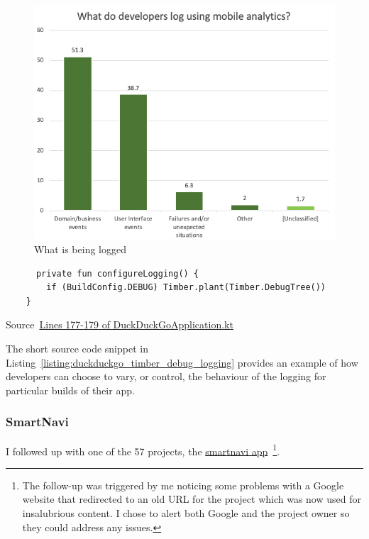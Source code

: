 \begin{figure}
    \centering
    \includegraphics[width=15cm]{images/mobile-analytics-logging/graph-for-research-question-2.png}
    \caption{What is being logged}
    \label{fig:logging_rq_2}
\end{figure}


\begin{listing}
\begin{verbatim}
      private fun configureLogging() {
        if (BuildConfig.DEBUG) Timber.plant(Timber.DebugTree())
    }
\end{verbatim}
\caption{Source~\href{https://github.com/duckduckgo/Android/blob/2f3d42be6a972551c2330daccba6ff4039e1c1a8/app/src/main/java/com/duckduckgo/app/global/DuckDuckGoApplication.kt\#L177-L179}{Lines 177-179 of DuckDuckGoApplication.kt}}
\label{listing:duckduckgo_timber_debug_logging}
\end{listing}

The short source code snippet in Listing~\ref{listing:duckduckgo_timber_debug_logging} provides an example of how developers can choose to vary, or control, the behaviour of the logging for particular builds of their app.


\subsubsection{SmartNavi}
I followed up with one of the 57 projects, the \href{https://smartnavi.app/home}{smartnavi app}~\footnote{The follow-up was triggered by me noticing some problems with a Google website that redirected to an old URL for the project which was now used for insalubrious content. I chose to alert both Google and the project owner so they could address any issues.}.


